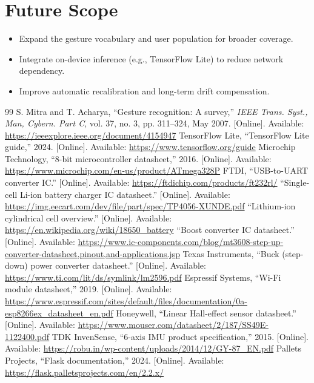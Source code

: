 \documentclass[12pt,a4paper]{report}
\begin{document}
\section{Future Scope}
\begin{itemize}[noitemsep]
  \item Expand the gesture vocabulary and user population for broader coverage.
  \item Integrate on-device inference (e.g., TensorFlow Lite) to reduce network dependency.
  \item Improve automatic recalibration and long-term drift compensation.
\end{itemize}

\begin{thebibliography}{99}
 S. Mitra and T. Acharya, ``Gesture recognition: A survey,'' \textit{IEEE Trans. Syst., Man, Cybern. Part C}, vol. 37, no. 3, pp. 311--324, May 2007. [Online]. Available: \url{https://ieeexplore.ieee.org/document/4154947}
 TensorFlow Lite, ``TensorFlow Lite guide,'' 2024. [Online]. Available: \url{https://www.tensorflow.org/guide}
 Microchip Technology, ``8-bit microcontroller datasheet,'' 2016. [Online]. Available: \url{https://www.microchip.com/en-us/product/ATmega328P}
 FTDI, ``USB-to-UART converter IC.'' [Online]. Available: \url{https://ftdichip.com/products/ft232rl/}
 ``Single-cell Li-ion battery charger IC datasheet.'' [Online]. Available: \url{https://img.eecart.com/dev/file/part/spec/TP4056-XUNDE.pdf}
 ``Lithium-ion cylindrical cell overview.'' [Online]. Available: \url{https://en.wikipedia.org/wiki/18650_battery}
 ``Boost converter IC datasheet.'' [Online]. Available: \url{https://www.ic-components.com/blog/mt3608-step-up-converter-datasheet,pinout,and-applications.jsp}
 Texas Instruments, ``Buck (step-down) power converter datasheet.'' [Online]. Available: \url{https://www.ti.com/lit/ds/symlink/lm2596.pdf}
 Espressif Systems, ``Wi-Fi module datasheet,'' 2019. [Online]. Available: \url{https://www.espressif.com/sites/default/files/documentation/0a-esp8266ex_datasheet_en.pdf}
 Honeywell, ``Linear Hall-effect sensor datasheet.'' [Online]. Available: \url{https://www.mouser.com/datasheet/2/187/SS49E-1122400.pdf}
 TDK InvenSense, ``6-axis IMU product specification,'' 2015. [Online]. Available: \url{https://robu.in/wp-content/uploads/2014/12/GY-87_EN.pdf}
 Pallets Projects, ``Flask documentation,'' 2024. [Online]. Available: \url{https://flask.palletsprojects.com/en/2.2.x/}
\end{thebibliography}
\end{document}
